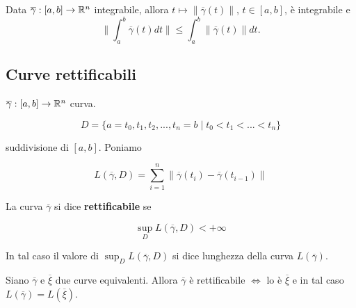 \begin{theorem}
	Data $\overline{\gamma}: [a,b]\rightarrow \mathbb{R}^n$ integrabile, allora $t \mapsto \|\overline{\gamma}(t)\|$, $t\in[a,b]$, è integrabile e 
	\begin{equation*}
		\|\int_a^b\overline{\gamma}(t)dt\|\leq \int_a^b\|\overline{\gamma}(t)\|dt.
	\end{equation*}
\end{theorem}


\subsection{Curve rettificabili}

$\overline{\gamma}:[a,b]\rightarrow\mathbb{R}^n$ curva. 

$$D=\{a=t_0,t_1,t_2,...,t_n=b\mid t_0<t_1<...<t_n\}$$

suddivisione di $[a,b]$. Poniamo 

$$L(\overline{\gamma},D)=\sum_{i=1}^{n}\| \overline{\gamma}(t_i)-\overline{\gamma}(t_{i-1}) \|$$

\segnaposto %


\begin{definition}
	La curva $\overline{\gamma}$ si dice \textbf{rettificabile} se 
	
	$$\sup_D L(\overline{\gamma},D)<+\infty$$
	
	In tal caso il valore di $\sup_D L(\overline{\gamma},D)$ si dice lunghezza della curva $L(\overline{\gamma})$.
\end{definition}


\begin{proposition}
	
	\label{pr: pag 425}
	Siano $\overline{\gamma}$ e $\overline{\xi}$ due curve equivalenti. Allora $\overline{\gamma}$ è rettificabile $\Leftrightarrow $ lo è $\overline{\xi}$ e in tal caso $L(\overline{\gamma})=L(\overline{\xi})$.
\end{proposition}


